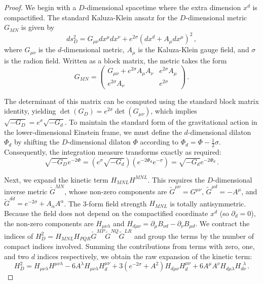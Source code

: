 \begin{tcolorbox}[breakable]
	\begin{proof}		 
	We begin with a $D$-dimensional spacetime where the extra dimension $x^d$ is compactified. The standard Kaluza-Klein ansatz for the $D$-dimensional metric $G_{MN}$ is given by
	\begin{equation}
		ds^2_D = G_{\mu\nu} dx^\mu dx^\nu + e^{2\sigma} (dx^d + A_\mu dx^\mu)^2 \, ,
	\end{equation}
	where $G_{\mu\nu}$ is the $d$-dimensional metric, $A_\mu$ is the Kaluza-Klein gauge field, and $\sigma$ is the radion field. Written as a block matrix, the metric takes the form
	\begin{equation}
		G_{MN} = \begin{pmatrix} G_{\mu\nu} + e^{2\sigma} A_\mu A_\nu & e^{2\sigma} A_\mu \\ e^{2\sigma} A_\nu & e^{2\sigma} \end{pmatrix} \, .
	\end{equation}
	
	The determinant of this matrix can be computed using the standard block matrix identity, yielding $\det(G_D) = e^{2\sigma} \det(G_{\mu\nu})$, which implies $\sqrt{-G_D} = e^\sigma \sqrt{-G_d}$. To maintain the standard form of the gravitational action in the lower-dimensional Einstein frame, we must define the $d$-dimensional dilaton $\Phi_d$ by shifting the $D$-dimensional dilaton $\Phi$ according to $\Phi_d = \Phi - \frac{1}{2}\sigma$. Consequently, the integration measure transforms exactly as required:
	\begin{equation}
		\sqrt{-G_D} e^{-2\Phi} = (e^\sigma \sqrt{-G_d}) (e^{-2\Phi_d} e^{-\sigma}) = \sqrt{-G_d} e^{-2\Phi_d} \, .
	\end{equation}
	
	Next, we expand the kinetic term $H_{MNL} H^{MNL}$. This requires the $D$-dimensional inverse metric $\tilde{G}^{MN}$, whose non-zero components are $\tilde{G}^{\mu\nu} = G^{\mu\nu}$, $\tilde{G}^{\mu d} = -A^\mu$, and $\tilde{G}^{dd} = e^{-2\sigma} + A_\alpha A^\alpha$. The 3-form field strength $H_{MNL}$ is totally antisymmetric. Because the field does not depend on the compactified coordinate $x^d$ (so $\partial_d = 0$), the non-zero components are $H_{\mu\nu\lambda}$ and $H_{d\mu\nu} = \partial_\mu B_{\nu d} - \partial_\nu B_{\mu d}$. We contract the indices of $H_D^2 = H_{MNL} H_{PQR} \tilde{G}^{MP} \tilde{G}^{NQ} \tilde{G}^{LR}$ and group the terms by the number of compact indices involved. Summing the contributions from terms with zero, one, and two $d$ indices respectively, we obtain the raw expansion of the kinetic term:
	\begin{equation}
		H_D^2 = H_{\mu\nu\lambda} H^{\mu\nu\lambda} - 6 A^\lambda H_{\mu\nu\lambda} H_d^{\mu\nu} + 3 (e^{-2\sigma} + A^2) H_{d\mu\nu} H_d^{\mu\nu} + 6 A^\mu A^\nu H_{d\mu\lambda} H_{d\nu}^{\ \ \lambda} \, .
		\label{eq:raw_kinetic}
	\end{equation}
	

\end{proof}
\end{tcolorbox}

